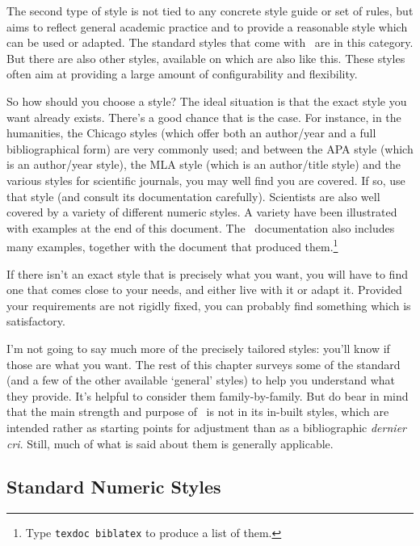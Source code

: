 The second type of style is not tied to any concrete style guide or
set of rules, but aims to reflect general academic practice and to
provide a reasonable style which can be used or
adapted. The standard styles that come with \biblatex\ are in this
category. But there are also other styles, available on
 which are also like this. These styles often aim at
providing a large amount of configurability and flexibility.

So how should you choose a style? The ideal situation is that the
exact style you want already exists. There's a good chance that is the
case. For instance, in the humanities, the Chicago styles (which offer
both an author/year and a full bibliographical form) are very commonly
used; and between the APA style (which is an author/year style), the
MLA style (which is an author/title style) and the various styles for
scientific journals, you may well find you are covered. If so, use
that style (and consult its documentation carefully). Scientists are
also well covered by a variety of different numeric styles. A variety
have been illustrated with examples at the end of this
document. The \biblatex\
documentation also includes many examples, together with the document
that produced them.\footnote[][-2ex]{Type \texttt{texdoc biblatex} to
  produce a list of them.}

If there isn't an exact style that is precisely what you want, you
will have to find one that comes close to your needs, and either live
with it or adapt it. Provided your requirements are not rigidly fixed,
you can probably find something which is satisfactory.

I'm not going to say much more of the precisely tailored styles:
you'll know if those are what you want. The rest of this chapter
surveys some of the standard (and a few of the other available
`general' styles) to help you understand what they provide. It's
helpful to consider them family-by-family. But do bear in mind that
the main strength and purpose of \biblatex\ is not in its in-built
styles, which are intended rather as starting points for adjustment
than as a bibliographic \emph{dernier cri}. Still, much of what is
said about them is generally applicable.

\subsection{Standard Numeric Styles}

